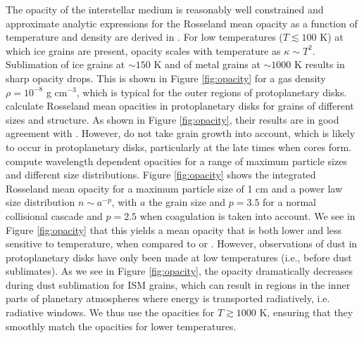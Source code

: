 \documentclass[apj]{emulateapj}
\begin{document}
The opacity of the interstellar medium is reasonably well constrained and approximate analytic expressions for the Rosseland mean opacity as a function of temperature and density are derived in \citet{bell94}. For low temperatures ($T \lesssim 100$ K) at which ice grains are present, opacity scales with temperature as $\kappa \sim T^2$. Sublimation of ice grains at $\sim$$150$ K and of metal grains at $\sim$$1000$ K results in sharp opacity drops. This is shown in Figure \ref{fig:opacity} for a gas density $\rho=10^{-8}$ g cm$^{-3}$, which is typical for the outer regions of protoplanetary disks. \citet{semenov03} calculate Rosseland mean opacities in protoplanetary disks for grains of different sizes and structure. As shown in Figure \ref{fig:opacity}, their results are in good agreement with \citet{bell94}. However, \citet{semenov03} do not take grain growth into account, which is likely to occur in protoplanetary disks, particularly at the late times when cores form. \citet{dalessio01} compute wavelength dependent opacities for a range of maximum particle sizes and different size distributions. Figure \ref{fig:opacity} shows the integrated Rosseland mean opacity for a maximum particle size of 1 cm and a power law size distribution $n \sim a^{-p}$, with $a$ the grain size and $p=3.5$ for a normal collisional cascade and $p=2.5$ when coagulation is taken into account. We see in Figure \ref{fig:opacity} that this yields a mean opacity that is both lower and less sensitive to temperature, when compared to \citet{bell94} or \citet{semenov03}. However, observations of dust in protoplanetary disks have only been made at low temperatures (i.e., before dust sublimates). As we see in Figure \ref{fig:opacity}, the opacity dramatically decreases during dust sublimation for ISM grains, which can result in regions in the inner parts of planetary atmospheres where energy is transported radiatively, i.e. radiative windows. We thus use the \citet{bell94} opacities for $T \gtrsim 1000$ K, ensuring that they smoothly match the \citet{dalessio01} opacities for lower temperatures.
\end{document}
